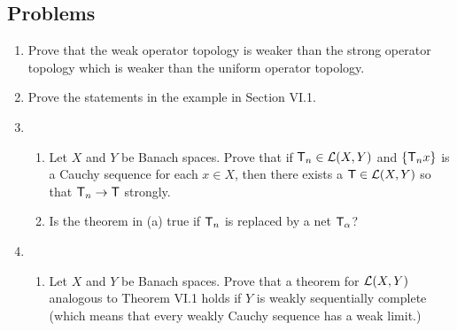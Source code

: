 \subsection*{Problems}

\begin{enumerate}
    \item Prove that the weak operator topology is weaker than the strong operator topology which is weaker than the uniform operator topology.
    \item Prove the statements in the example in Section VI.1.
    \item \begin{enumerate}
        \item Let $X$ and $Y$ be Banach spaces. Prove that if $\mathsf{T}_n \in \mathcal L(X,Y)$ and $\left \lbrace \mathsf{T}_n x \right \rbrace$ is a Cauchy sequence for each $x \in X$, then there exists a $\mathsf{T} \in \mathcal L(X,Y)$ so that $\mathsf{T}_n \rightarrow \mathsf{T}$ strongly.
        \item Is the theorem in (a) true if $\mathsf{T}_n$ is replaced by a net $\mathsf{T}_\alpha$?
    \end{enumerate}

    \item \begin{enumerate}
        \item Let $X$ and $Y$ be Banach spaces. Prove that a theorem for $\mathcal L(X,Y)$ analogous to Theorem VI.1 holds if $Y$ is weakly sequentially complete (which means that every weakly Cauchy sequence has a weak limit.)
    \end{enumerate}
\end{enumerate}